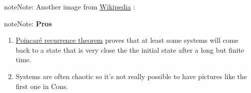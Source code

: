 \documentclass[letterpaper,10pt,english]{sphinxmanual}
\begin{document}
\begin{notice}{note}{Note:}
Another image from \href{https://commons.wikimedia.org/wiki/File:Ergodic\_hypothesis\_w\_reflecting\_rays.jpg}{Wikipedia} :

{\hfill{}\hfill}
\end{notice}

\begin{notice}{note}{Note:}
\textbf{Pros}
\begin{enumerate}
\item {} 
\href{https://en.wikipedia.org/wiki/Poincar\%C3\%A9\_recurrence\_theorem}{Poincaré recurrence theorem} proves that at least some systems will come back to a state that is very close the the initial state after a long but finite time.

\item {} 
Systems are often chaotic so it's not really possible to have pictures like the first one in Cons.

\end{enumerate}
\end{notice}
\end{document}
